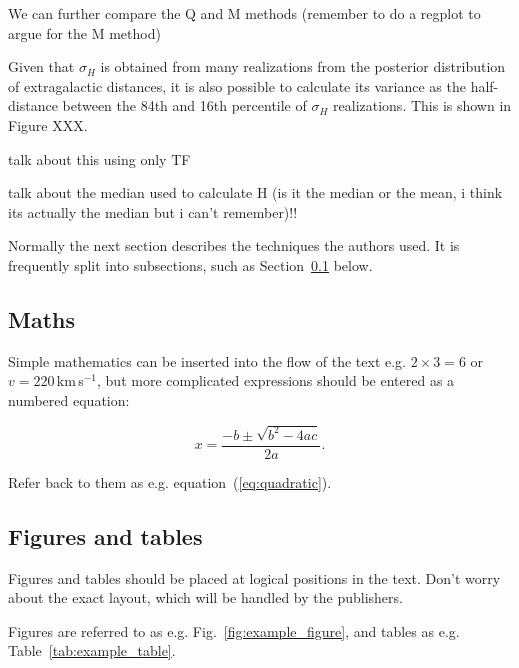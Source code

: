 \documentclass[a4paper,fleqn,usenatbib]{mnras}
\begin{document}
We can further compare the Q and M methods (remember to do a regplot to argue for the M method)

Given that $\sigma_H$ is obtained from many realizations from the posterior distribution of extragalactic distances, it is also possible to calculate its variance as the half-distance between the 84th and 16th percentile of $\sigma_H$ realizations. This is shown in Figure XXX.

talk about this using only TF


talk about the median used to calculate H (is it the median or the mean, i think its actually the median but i can't remember)!!

Normally the next section describes the techniques the authors used.
It is frequently split into subsections, such as Section~\ref{sec:maths} below.

\subsection{Maths}
\label{sec:maths} %

Simple mathematics can be inserted into the flow of the text e.g. $2\times3=6$
or $v=220$\,km\,s$^{-1}$, but more complicated expressions should be entered
as a numbered equation:

\begin{equation}
    x=\frac{-b\pm\sqrt{b^2-4ac}}{2a}.
	\label{eq:quadratic}
\end{equation}

Refer back to them as e.g. equation~(\ref{eq:quadratic}).

\subsection{Figures and tables}

Figures and tables should be placed at logical positions in the text. Don't
worry about the exact layout, which will be handled by the publishers.

Figures are referred to as e.g. Fig.~\ref{fig:example_figure}, and tables as
e.g. Table~\ref{tab:example_table}.
\end{document}

